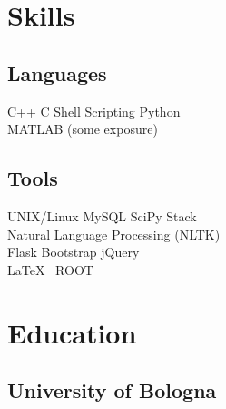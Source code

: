 \documentclass[letterpaper]{deedy-resume} %
\begin{document}
\begin{minipage}[t]{0.29\textwidth} %


\section{Skills}

\subsection{Languages}
C++ \textbullet{} C \textbullet{} Shell Scripting \textbullet{} Python \\ 
 MATLAB (some exposure) \\ 

\subsection{Tools}
UNIX/Linux \textbullet{} MySQL \textbullet{} SciPy Stack \\
Natural Language Processing (NLTK) \\
Flask \textbullet{} Bootstrap \textbullet{} jQuery \\
\LaTeX\ \textbullet{} ROOT \\

\sectionspace %



\section{Education} 

\subsection{University of Bologna}


\sectionspace %


\end{minipage}
\end{document}
